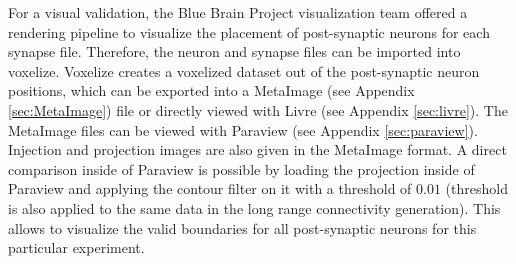 For a visual validation, the Blue Brain Project visualization team offered a rendering pipeline to visualize the placement of post-synaptic neurons for each synapse file. Therefore, the neuron and synapse files can be imported into 
voxelize. Voxelize creates a voxelized dataset out of the post-synaptic neuron positions, which can be exported into
a MetaImage (see Appendix \ref{sec:MetaImage}) file or directly viewed with Livre (see Appendix \ref{sec:livre}).
The MetaImage files can be viewed with Paraview (see Appendix \ref{sec:paraview}).
Injection and projection images are also given in the MetaImage format.
A direct comparison inside of Paraview is possible by
loading the projection inside of Paraview and applying the contour filter on it with a threshold of $0.01$ (threshold is also applied to the same data in the long range connectivity generation). This allows to visualize the valid boundaries for all post-synaptic neurons for this particular experiment.
 

